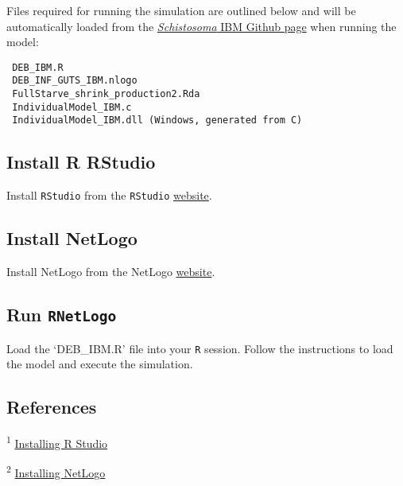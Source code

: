 \documentclass[10,portrait]{article}
\begin{document}
Files required for running the simulation are outlined below and will be
automatically loaded from the
\href{https://github.com/darwinanddavis/SchistoIBM}{\emph{Schistosoma}
IBM Github page} when running the model:

\begin{verbatim}
 DEB_IBM.R  
 DEB_INF_GUTS_IBM.nlogo  
 FullStarve_shrink_production2.Rda  
 IndividualModel_IBM.c  
 IndividualModel_IBM.dll (Windows, generated from C)      
\end{verbatim}

\subsection{Install R RStudio}\label{install-r-rstudio}

Install \texttt{RStudio} from the \texttt{RStudio}
\href{https://www.rstudio.com/products/rstudio/download/\#download}{website}.

\subsection{Install NetLogo}\label{install-netlogo}

Install NetLogo from the NetLogo
\href{https://ccl.northwestern.edu/netlogo/download.shtml}{website}.

\subsection{\texorpdfstring{Run
\texttt{RNetLogo}}{Run RNetLogo}}\label{run-rnetlogo}

Load the `DEB\_IBM.R' file into your \texttt{R} session. Follow the
instructions to load the model and execute the simulation.

\subsection{References}\label{references}

\textsuperscript{1}
\href{https://www.rstudio.com/products/rstudio/download/\#download}{Installing
R Studio}

\textsuperscript{2}
\href{https://www.rstudio.com/products/rstudio/download/\#download}{Installing
NetLogo}

\printbibliography
\end{document}
